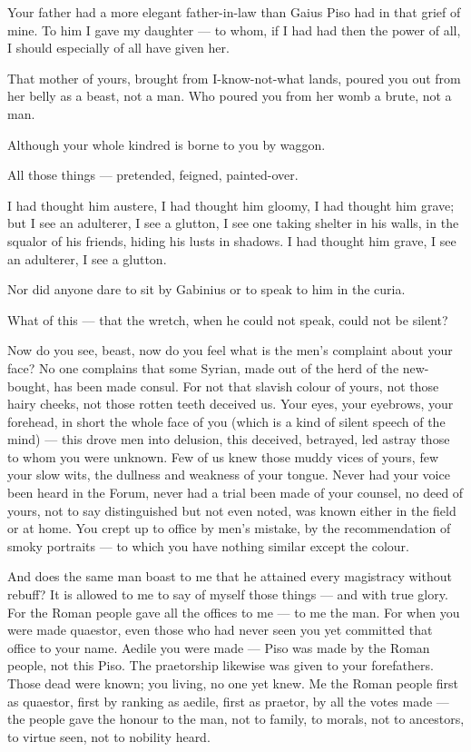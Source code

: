  Your father had a more elegant father-in-law than Gaius Piso had in that grief of mine. To him I gave my daughter — to whom, if I had had then the power of all, I should especially of all have given her.

 That mother of yours, brought from I-know-not-what lands, poured you out from her belly as a beast, not a man. Who poured you from her womb a brute, not a man.

 Although your whole kindred is borne to you by waggon.

 All those things — pretended, feigned, painted-over.

 I had thought him austere, I had thought him gloomy, I had thought him grave; but I see an adulterer, I see a glutton, I see one taking shelter in his walls, in the squalor of his friends, hiding his lusts in shadows. I had thought him grave, I see an adulterer, I see a glutton.

 Nor did anyone dare to sit by Gabinius or to speak to him in the curia.

 What of this — that the wretch, when he could not speak, could not be silent?

 Now do you see, beast, now do you feel what is the men's complaint about your face? No one complains that some Syrian, made out of the herd of the new-bought, has been made consul. For not that slavish colour of yours, not those hairy cheeks, not those rotten teeth deceived us. Your eyes, your eyebrows, your forehead, in short the whole face of you (which is a kind of silent speech of the mind) — this drove men into delusion, this deceived, betrayed, led astray those to whom you were unknown. Few of us knew those muddy vices of yours, few your slow wits, the dullness and weakness of your tongue. Never had your voice been heard in the Forum, never had a trial been made of your counsel, no deed of yours, not to say distinguished but not even noted, was known either in the field or at home. You crept up to office by men's mistake, by the recommendation of smoky portraits — to which you have nothing similar except the colour.

 And does the same man boast to me that he attained every magistracy without rebuff? It is allowed to me to say of myself those things — and with true glory. For the Roman people gave all the offices to me — to me the man. For when you were made quaestor, even those who had never seen you yet committed that office to your name. Aedile you were made — Piso was made by the Roman people, not this Piso. The praetorship likewise was given to your forefathers. Those dead were known; you living, no one yet knew. Me the Roman people first as quaestor, first by ranking as aedile, first as praetor, by all the votes made — the people gave the honour to the man, not to family, to morals, not to ancestors, to virtue seen, not to nobility heard.

